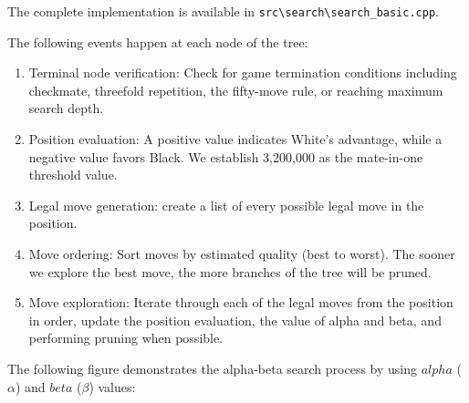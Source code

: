 \vspace{1em}

\noindent \parbox{\textwidth}{The complete implementation is available in \texttt{src\textbackslash{}search\textbackslash{}search\_basic.cpp}.}

\vspace{1em}

\noindent The following events happen at each node of the tree:

\begin{enumerate}
    \item Terminal node verification: Check for game termination conditions including checkmate, threefold repetition, the fifty-move rule, or reaching maximum search depth.
    \item Position evaluation: A positive value indicates White's advantage, while a negative value favors Black. We establish 3,200,000 as the mate-in-one threshold value.
    \item Legal move generation: create a list of every possible legal move in the position.
    \item Move ordering: Sort moves by estimated quality (best to worst). The sooner we explore the best move, the more branches of the tree will be pruned.
    \item Move exploration: Iterate through each of the legal moves from the position in order, update the position evaluation, the value of alpha and beta, and performing pruning when possible.
\end{enumerate}

\noindent The following figure demonstrates the alpha-beta search process by using $alpha$ ($\alpha$) and $beta$ ($\beta$) values:

\newpage

